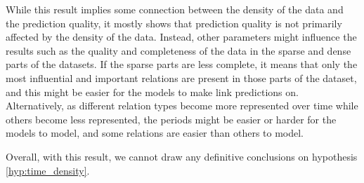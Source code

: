 While this result implies some connection between the density of the data and the prediction quality, it mostly shows that prediction quality is not primarily affected by the density of the data. Instead, other parameters might influence the results such as the quality and completeness of the data in the sparse and dense parts of the datasets. If the sparse parts are less complete, it means that only the most influential and important relations are present in those parts of the dataset, and this might be easier for the models to make link predictions on. Alternatively, as different relation types become more represented over time while others become less represented, the periods might be easier or harder for the models to model, and some relations are easier than others to model.

Overall, with this result, we cannot draw any definitive conclusions on hypothesis \autoref{hyp:time_density}.
